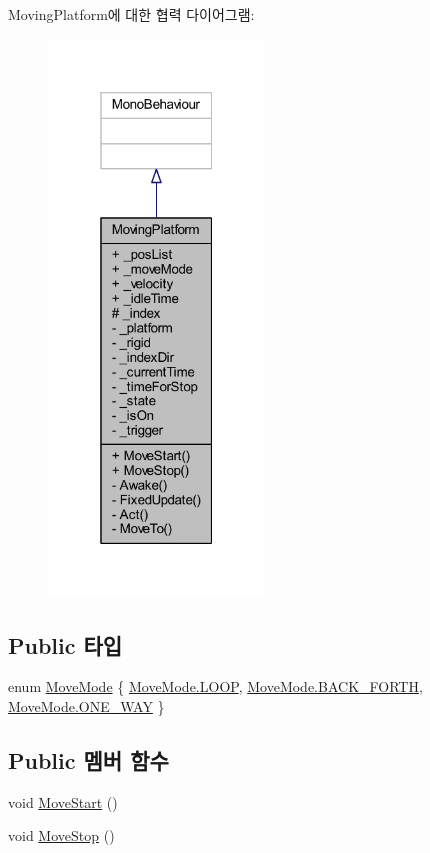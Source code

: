 Moving\+Platform에 대한 협력 다이어그램\+:
\nopagebreak
\begin{figure}[H]
\begin{center}
\leavevmode
\includegraphics[width=163pt]{df/d56/class_moving_platform__coll__graph}
\end{center}
\end{figure}
\subsection*{Public 타입}
\begin{DoxyCompactItemize}
\item 
enum \mbox{\hyperlink{class_moving_platform_a7b3427d2906069ecf4c39d69eee53653}{Move\+Mode}} \{ \mbox{\hyperlink{class_moving_platform_a7b3427d2906069ecf4c39d69eee53653a9159b3578e4e1eb31ffdf90acd6f6e40}{Move\+Mode.\+L\+O\+OP}}, 
\mbox{\hyperlink{class_moving_platform_a7b3427d2906069ecf4c39d69eee53653a567fc8818cb224cde6a676cb700ac1e3}{Move\+Mode.\+B\+A\+C\+K\+\_\+\+F\+O\+R\+TH}}, 
\mbox{\hyperlink{class_moving_platform_a7b3427d2906069ecf4c39d69eee53653aaa30404ca3fb4604d829dacae0444dd1}{Move\+Mode.\+O\+N\+E\+\_\+\+W\+AY}}
 \}
\end{DoxyCompactItemize}
\subsection*{Public 멤버 함수}
\begin{DoxyCompactItemize}
\item 
void \mbox{\hyperlink{class_moving_platform_a2e7148eddf9ada2373e3507c02146896}{Move\+Start}} ()
\item 
void \mbox{\hyperlink{class_moving_platform_a9150bceccb63034907ab3ec46216ae83}{Move\+Stop}} ()
\end{DoxyCompactItemize}
